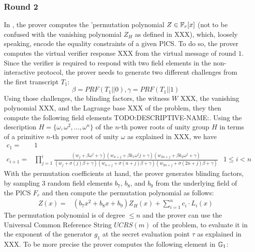 \subsubsection{Round 2}
In , the prover computes the 'permutation polynomial $Z\in \mathbb{F}_r[x]$ (not to be confused with the vanishing polynomial $Z_H$ as defined in XXX), which, loosely speaking, encode the equality constraints of a given PlCS. To do so, the prover computes the virtual verifier response XXX from the virtual message of round $1$. Since the verifier is required to respond with two field elements in the non-interactive protocol, the prover needs to generate two different challenges from the first transcript $T_1$: 
\begin{equation}
\beta=PRF(T_1 || 0), \gamma=PRF(T_1 || 1)
\end{equation}
Using those challenges, the blinding factors, the witness $W$ XXX, the vanishing polynomial XXX, and the Lagrange base XXX of the problem, they then compute the following field elements TODO:DESCRIPTIVE-NAME:. Using the description $H=\{\omega,\omega^2, \ldots, \omega^n\}$ of the $n$-th power roots of unity group $H$ in terms of a primitive $n$-th power root of unity $\omega$ as explained in XXX, we have
\begin{equation}
\begin{array}{rll}
c_1 = & 1\\
c_{i+1} = & \prod_{j=1}^i \frac{(w_j+\beta\omega^j+\gamma)(w_{n+j}+\beta k_1\omega^jj+\gamma)(w_{2n+j}+\beta k_2\omega^j+\gamma)}{(w_j+\sigma(j)\beta+\gamma)(w_{n+j}+\sigma(n+j)\beta+\gamma)(w_{2n+j}+\sigma(2n+j)\beta+\gamma)} & 1\leq i <n
\end{array}
\end{equation}
With the permutation coefficients at hand, the prover generates blinding factors, by sampling $3$ random field elements $b_7$, $b_8$, and $b_9$ from the underlying field of the PlCS $F_r$ and then compute the permutation polynomial as follows:
\begin{equation}
\begin{array}{rl}
Z(x) = & (b_7x^2+b_8x+b_9)Z_H(x)+\sum_{i=1}^{n} c_i\cdot L_{i}(x)
\end{array}
\end{equation}
The permutation polynomial is of degree $\leq n$ and the prover can use the Universal Common Reference String $UCRS(m)$ of the problem, to evaluate it in the exponent of the generator $g_1$ at the secret evaluation point $\tau$ as explained in XXX. To be more precise the prover computes the following element in $\mathbb{G}_1$: 

